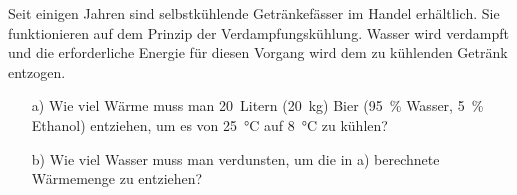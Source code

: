 
\begin{aufgabe}
Seit einigen Jahren sind selbstkühlende Getränkefässer im Handel erhältlich.
Sie funktionieren auf dem Prinzip der Verdampfungskühlung.
Wasser wird verdampft und die erforderliche Energie für diesen Vorgang wird dem zu kühlenden Getränk entzogen.

\begin{itemize}
	\item [a)] Wie viel Wärme muss man \SI{20}{Litern} (\SI{20}{kg}) Bier (\SI{95}{\percent} Wasser, \SI{5}{\percent} Ethanol) entziehen, um es von \SI{25}{\celsius} auf \SI{8}{\celsius} zu kühlen?
	\item [b)] Wie viel Wasser muss man verdunsten, um die in a) berechnete Wärmemenge zu entziehen?
\end{itemize}
\end{aufgabe}

